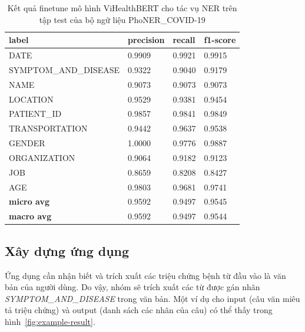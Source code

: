 \begin{table}
\centering
\begin{tabular}{|l|l|l|l|}
\hline
\textbf{label}        & \textbf{precision} & \textbf{recall} & \textbf{f1-score} \\ \hline
DATE                  & 0.9909             & 0.9921          & 0.9915            \\ \hdashline
SYMPTOM\_AND\_DISEASE & 0.9322             & 0.9040          & 0.9179            \\ \hdashline
NAME                  & 0.9073             & 0.9073          & 0.9073            \\ \hdashline
LOCATION              & 0.9529             & 0.9381          & 0.9454            \\ \hdashline
PATIENT\_ID           & 0.9857             & 0.9841          & 0.9849            \\ \hdashline
TRANSPORTATION        & 0.9442             & 0.9637          & 0.9538            \\ \hdashline
GENDER                & 1.0000             & 0.9776          & 0.9887            \\ \hdashline
ORGANIZATION          & 0.9064             & 0.9182          & 0.9123            \\ \hdashline
JOB                   & 0.8659             & 0.8208          & 0.8427            \\ \hdashline
AGE                   & 0.9803             & 0.9681          & 0.9741            \\ \hline
\textbf{micro avg}    & 0.9592             & 0.9497          & 0.9545            \\ \hline
\textbf{macro avg}    & 0.9592             & 0.9497          & 0.9544            \\ \hline
\end{tabular}
\caption{Kết quả finetune mô hình ViHealthBERT cho tác vụ NER trên tập test của bộ ngữ liệu PhoNER\_COVID-19}
\label{tab:results-test}
\end{table}

\subsection{Xây dựng ứng dụng}
Ứng dụng cần nhận biết và trích xuất các triệu chứng bệnh từ đầu vào là văn bản của người dùng. Do vậy, nhóm sẽ trích xuất các từ được gán nhãn \textit{SYMPTOM\_AND\_DISEASE} trong văn bản. Một ví dụ cho input (câu văn miêu tả triệu chứng) và output (danh sách các nhãn của câu) có thể thấy trong hình~\ref{fig:example-result}.

